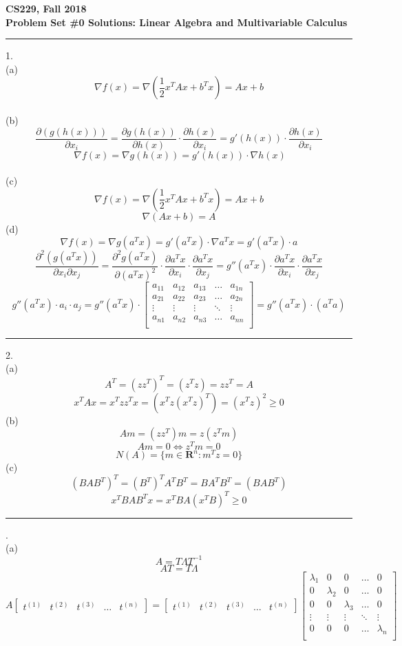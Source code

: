 \documentclass{article}
\begin{document}
\begin{flushleft}
\textbf{\Large CS229, Fall 2018\\Problem Set \#0 Solutions: Linear Algebra and Multivariable Calculus}
\end{flushleft}
\noindent\rule{\linewidth}{0.4pt}  %
\vspace{1em}
1. \\
(a) \[\nabla f(x) = \nabla \left( \frac{1}{2} x^T A x + b^T x \right) = A x + b\]\\
(b) \[\frac{\partial \left( g(h(x)) \right)}{\partial x_i} = \frac{\partial g(h(x))}{\partial h(x)} \cdot \frac{\partial h(x)}{\partial x_i} = g'(h(x)) \cdot \frac{\partial h(x)}{\partial x_i}\]\[\ \nabla f(x)=\nabla g(h(x))= g'(h(x))\cdot \nabla h(x) \]\\
(c) \[\nabla f(x) = \nabla \left( \frac{1}{2} x^T A x + b^T x \right) = A x + b\]\[ \nabla (Ax+b)= A \]
(d) \[\nabla f(x) = \nabla g(a^T x) = g'(a^T x) \cdot \nabla a^T x = g'(a^T x) \cdot a\]
\[\frac{\partial^2 \left( g(a^T x) \right)}{\partial x_i \partial x_j} = \frac{\partial^2 g(a^T x)}{\partial (a^T x)^2} \cdot \frac{\partial a^T x}{\partial x_i} \cdot \frac{\partial a^T x}{\partial x_j} = g''(a^T x) \cdot \frac{\partial a^T x}{\partial x_i} \cdot \frac{\partial a^T x}{\partial x_j}\]
\[g''(a^T x) \cdot a_i \cdot a_j = g''(a^T x) \cdot\left[ 
\begin{matrix}
a_{11} & a_{12} & a_{13} & \ldots & a_{1n} \\
a_{21} & a_{22} & a_{23} & \ldots & a_{2n} \\
\vdots  & \vdots & \vdots & \ddots & \vdots \\
a_{n1} & a_{n2} & a_{n3} & \ldots & a_{nn} \\
\end{matrix}
\right]=g''(a^T x) \cdot (a^Ta)
\]
\noindent\rule{\linewidth}{0.05pt}
2. \\
(a) \[A^T=(zz^T)^T=(z^Tz)=zz^T=A\] \[x^TAx=x^Tzz^Tx=(x^Tz(x^Tz)^T)=(x^Tz)^2 \geq 0 \]
(b) \[Am=(zz^T)m=z(z^Tm)\]\[Am=0 \iff z^Tm=0 \]\[N(A)=\{m \in \mathbf{R}^n:m^Tz=0\}\]
(c) \[(BAB^T)^T=(B^T)^TA^TB^T=BA^TB^T=(BAB^T)\]\[x^TBAB^Tx=x^TBA(x^TB)^T\geq 0\]
\vspace{1em}    
\noindent\rule{\linewidth}{0.05pt}
. \\
(a) \[A =T\Lambda T^{-1}\]\[AT=T\Lambda\]\[A\left[ \begin{matrix}
    t^{(1)} & t^{(2)} & t^{(3)} & \ldots & t^{(n)}
\end{matrix}\right]=\left[ \begin{matrix}
    t^{(1)} & t^{(2)} & t^{(3)} & \ldots & t^{(n)}
\end{matrix} \right]\left[ \begin{matrix}
    \lambda_1 & 0 & 0 &\ldots & 0\\
    0 & \lambda_2 & 0 &\ldots & 0\\
    0 & 0 & \lambda_3 &\ldots & 0\\
    \vdots & \vdots& \vdots & \ddots & \vdots\\
    0 & 0 & 0 & \ldots & \lambda_n\\
\end{matrix} \right] \]
\end{document}

